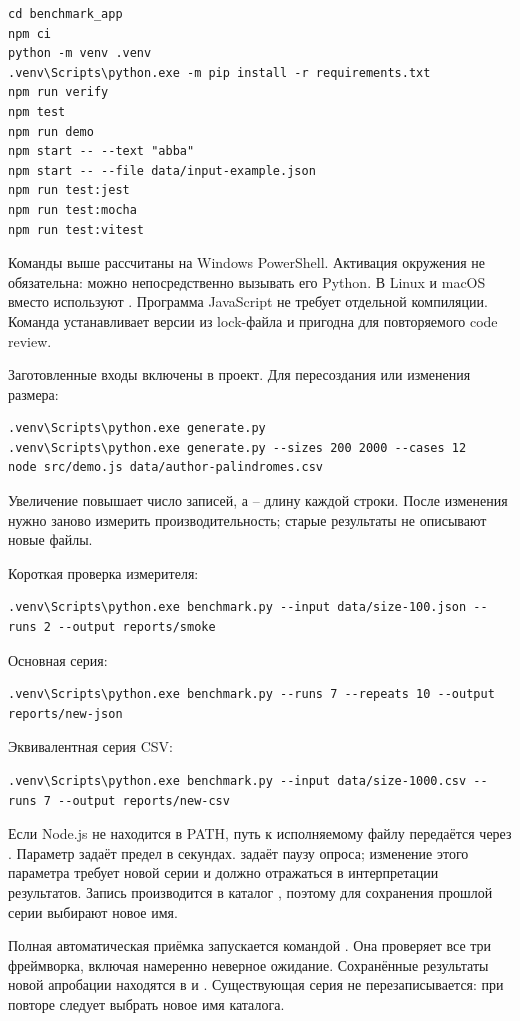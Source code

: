\begin{lstlisting}
cd benchmark_app
npm ci
python -m venv .venv
.venv\Scripts\python.exe -m pip install -r requirements.txt
npm run verify
npm test
npm run demo
npm start -- --text "abba"
npm start -- --file data/input-example.json
npm run test:jest
npm run test:mocha
npm run test:vitest
\end{lstlisting}

Команды выше рассчитаны на Windows PowerShell. Активация окружения не обязательна: можно непосредственно вызывать его Python. В Linux и macOS вместо  используют . Программа JavaScript не требует отдельной компиляции. Команда  устанавливает версии из lock-файла и пригодна для повторяемого code review.

Заготовленные входы включены в проект. Для пересоздания или изменения размера:
\begin{lstlisting}
.venv\Scripts\python.exe generate.py
.venv\Scripts\python.exe generate.py --sizes 200 2000 --cases 12
node src/demo.js data/author-palindromes.csv
\end{lstlisting}
Увеличение  повышает число записей, а  -- длину каждой строки. После изменения нужно заново измерить производительность; старые результаты не описывают новые файлы.

Короткая проверка измерителя:
\begin{lstlisting}
.venv\Scripts\python.exe benchmark.py --input data/size-100.json --runs 2 --output reports/smoke
\end{lstlisting}
Основная серия:
\begin{lstlisting}
.venv\Scripts\python.exe benchmark.py --runs 7 --repeats 10 --output reports/new-json
\end{lstlisting}
Эквивалентная серия CSV:
\begin{lstlisting}
.venv\Scripts\python.exe benchmark.py --input data/size-1000.csv --runs 7 --output reports/new-csv
\end{lstlisting}

Если Node.js не находится в PATH, путь к исполняемому файлу передаётся через . Параметр  задаёт предел в секундах.  задаёт паузу опроса; изменение этого параметра требует новой серии и должно отражаться в интерпретации результатов. Запись производится в каталог , поэтому для сохранения прошлой серии выбирают новое имя.

Полная автоматическая приёмка запускается командой . Она проверяет все три фреймворка, включая намеренно неверное ожидание. Сохранённые результаты новой апробации находятся в  и . Существующая серия не перезаписывается: при повторе следует выбрать новое имя каталога.

